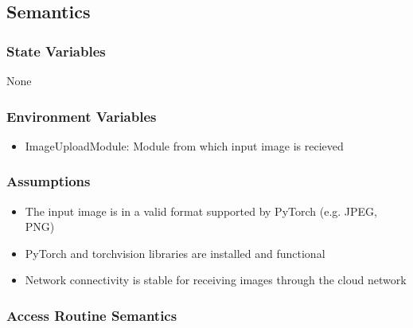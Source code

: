 \documentclass[12pt, titlepage]{article}
\begin{document}
\subsection{Semantics}

\subsubsection{State Variables}
None



\subsubsection{Environment Variables}
\begin{itemize}
  \item ImageUploadModule: Module from which input image is recieved
\end{itemize}

\subsubsection{Assumptions}
\begin{itemize}
  \item The input image is in a valid format supported by PyTorch (e.g. JPEG, PNG)
  \item PyTorch and torchvision libraries are installed and functional
  \item Network connectivity is stable for receiving images through the cloud network
\end{itemize}


\subsubsection{Access Routine Semantics}
\end{document}
